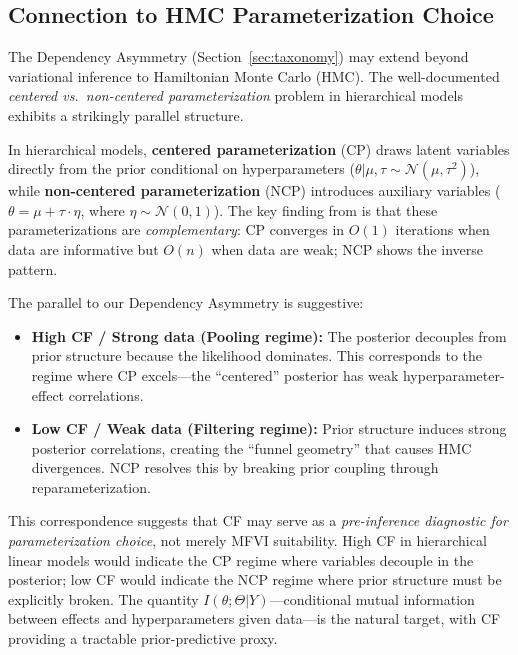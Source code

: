\documentclass[10pt]{article} %
\theoremstyle{plain}
\theoremstyle{definition}
\begin{document}
\subsection{Connection to HMC Parameterization Choice}
\label{sec:hmc-connection}

The Dependency Asymmetry (Section~\ref{sec:taxonomy}) may extend beyond variational inference to Hamiltonian Monte Carlo (HMC). The well-documented \emph{centered vs.\ non-centered parameterization} problem in hierarchical models \citep{papaspiliopoulos2007general} exhibits a strikingly parallel structure.

In hierarchical models, \textbf{centered parameterization} (CP) draws latent variables directly from the prior conditional on hyperparameters ($\theta | \mu, \tau \sim \mathcal{N}(\mu, \tau^2)$), while \textbf{non-centered parameterization} (NCP) introduces auxiliary variables ($\theta = \mu + \tau \cdot \eta$, where $\eta \sim \mathcal{N}(0,1)$). The key finding from \citet{papaspiliopoulos2007general} is that these parameterizations are \emph{complementary}: CP converges in $O(1)$ iterations when data are informative but $O(n)$ when data are weak; NCP shows the inverse pattern.

The parallel to our Dependency Asymmetry is suggestive:
\begin{itemize}[nosep]
    \item \textbf{High CF / Strong data (Pooling regime):} The posterior decouples from prior structure because the likelihood dominates. This corresponds to the regime where CP excels---the ``centered'' posterior has weak hyperparameter-effect correlations.
    \item \textbf{Low CF / Weak data (Filtering regime):} Prior structure induces strong posterior correlations, creating the ``funnel geometry'' \citep{betancourt2015hamiltonian} that causes HMC divergences. NCP resolves this by breaking prior coupling through reparameterization.
\end{itemize}

This correspondence suggests that CF may serve as a \emph{pre-inference diagnostic for parameterization choice}, not merely MFVI suitability. High CF in hierarchical linear models would indicate the CP regime where variables decouple in the posterior; low CF would indicate the NCP regime where prior structure must be explicitly broken. The quantity $I(\theta; \Theta | Y)$---conditional mutual information between effects and hyperparameters given data---is the natural target, with CF providing a tractable prior-predictive proxy.
\end{document}
